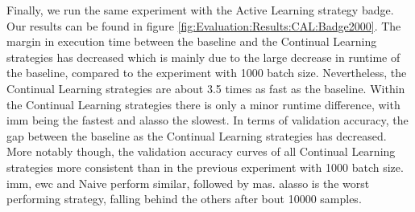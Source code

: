 Finally, we run the same experiment with the Active Learning strategy \gls{badge}. Our results can be found in figure \ref{fig:Evaluation:Results:CAL:Badge2000}. The margin in execution time between the baseline
and the Continual Learning strategies has decreased which is mainly due to the large decrease in runtime of the baseline, compared to the experiment with 1000 batch size. Nevertheless, the Continual
Learning strategies are about 3.5 times as fast as the baseline. Within the Continual Learning strategies there is only a minor runtime difference, with \gls{imm} being the fastest and \gls{alasso} the slowest. In terms of 
validation accuracy, the gap between the baseline as the Continual Learning strategies has decreased. More notably though, the validation accuracy curves of all Continual Learning strategies more consistent than
in the previous experiment with 1000 batch size. \gls{imm}, \gls{ewc} and Naive perform similar, followed by \gls{mas}. \gls{alasso} is the worst performing strategy, falling behind the others after bout 10000 samples. \par

